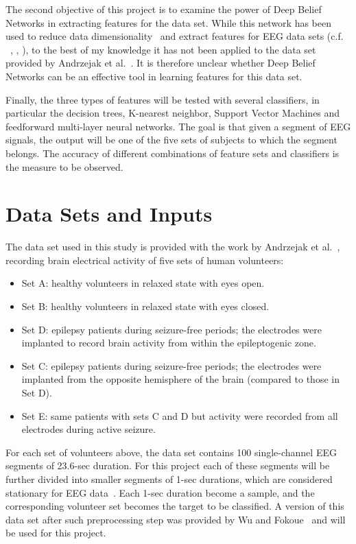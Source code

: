 \documentclass[12pt]{article}
\begin{document}
The second objective of this project is to examine the power of Deep Belief Networks in extracting features for the data set. While this network has been used to reduce data dimensionality~\cite{hinton2006reducing} and extract features for EEG data sets (c.f. ~\cite{langkvist2012sleep}, \cite{wang2013modeling}, \cite{wulsin2011modeling}), to the best of my knowledge it has not been applied to the data set provided by Andrzejak et al.~\cite{andrzejak2001indications}. It is therefore unclear whether Deep Belief Networks can be an effective tool in learning features for this data set.

Finally, the three types of features will be tested with several classifiers, in particular the decision trees, K-nearest neighbor, Support Vector Machines and feedforward multi-layer neural networks. The goal is that given a segment of EEG signals, the output will be one of the five sets of subjects to which the segment belongs. The accuracy of different combinations of feature sets and classifiers is the measure to be observed.

\section{Data Sets and Inputs}

The data set used in this study is provided with the work by Andrzejak et al.~\cite{andrzejak2001indications}, recording brain electrical activity of five sets of human volunteers:
\begin{itemize}
\item Set A: healthy volunteers in relaxed state with eyes open.
\item Set B: healthy volunteers in relaxed state with eyes closed.
\item Set D: epilepsy patients during seizure-free periods; the electrodes were implanted to record brain activity from within the epileptogenic zone.
\item Set C: epilepsy patients during seizure-free periods; the electrodes were implanted from the opposite hemisphere of the brain (compared to those in Set D).
\item Set E: same patients with sets C and D but activity were recorded from all electrodes during active seizure.
\end{itemize}

For each set of volunteers above, the data set contains 100 single-channel EEG segments of 23.6-sec duration. For this project each of these segments will be further divided into smaller segments of 1-sec durations, which are considered stationary for EEG data~\cite{nigam2004neural}. Each 1-sec duration become a sample, and the corresponding volunteer set becomes the target to be classified. A version of this data set after such preprocessing step was provided by Wu and Fokoue~\cite{UCISeizure} and will be used for this project. 
\end{document}
